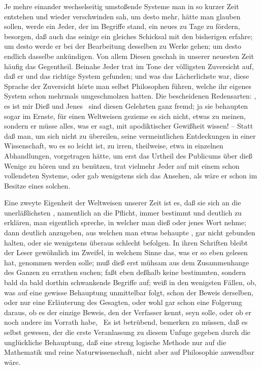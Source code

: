 \begin{aufza}
\begin{aufzb}
\item Je mehre einander wechselseitig umstoßende Systeme man in so kurzer Zeit entstehen und wieder verschwinden sah, um desto mehr, hätte man glauben sollen, werde ein Jeder, der im Begriffe stand, ein neues zu Tage zu fördern, besorgen, daß auch das seinige ein gleiches Schicksal mit den bisherigen erfahre; um desto  werde er bei der Bearbeitung desselben zu Werke gehen; um desto  endlich dasselbe ankündigen. Von allem Diesen geschah in unserer neuesten Zeit häufig das Gegentheil. Beinahe Jeder trat im Tone der völligsten Zuversicht auf, daß er und  das richtige System gefunden; und was das Lächerlichste war, diese Sprache der Zuversicht hörte man selbst Philosophen führen, welche ihr eigenes System schon mehrmals umgeschmolzen hatten. Die bescheidenen Redensarten: , es ist mir  Dieß und Jenes  \usw\, sind diesen Gelehrten ganz fremd; ja sie behaupten sogar im Ernste, für einen Weltweisen gezieme es sich nicht, etwas zu meinen, sondern er müsse alles, was er sagt, mit apodiktischer Gewißheit wissen! -- Statt daß man, um sich nicht zu übereilen, seine vermeintlichen Entdeckungen in einer Wissenschaft, wo es so leicht ist, zu irren, theilweise, etwa in einzelnen Abhandlungen, vorgetragen hätte, um erst das Urtheil des Publicums über dieß Wenige zu hören und zu benützen, trat vielmehr Jeder auf mit einem schon vollendeten Systeme, oder gab wenigstens sich das Ansehen, als wäre er schon im Besitze eines solchen.
\item Eine zweyte Eigenheit der Weltweisen unserer Zeit ist es, daß sie sich an die unerläßlichsten , namentlich an die Pflicht, immer bestimmt und deutlich zu erklären,  man eigentlich spreche, in welcher  man dieß oder jenes Wort nehme; dann deutlich anzugeben, aus welchen  man etwas behaupte \usw , gar nicht gebunden halten, oder sie wenigstens überaus schlecht befolgen. In ihren Schriften bleibt der Leser gewöhnlich im Zweifel, in welchem Sinne das, was er so eben gelesen hat, genommen werden solle; muß dieß erst mühsam aus dem Zusammenhange des Ganzen zu errathen suchen; faßt eben deßhalb keine bestimmten, sondern bald da bald dorthin schwankende Begriffe auf; weiß in den wenigsten Fällen, ob, was auf eine gewisse Behauptung unmittelbar folgt, schon der Beweis derselben, oder nur eine Erläuterung des Gesagten, oder wohl gar schon eine Folgerung daraus, ob es der einzige Beweis, den der Verfasser kennt, seyn solle, oder ob er noch andere im Vorrath habe, \usw\ Es ist betrübend, bemerken zu müssen, daß es  selbst gewesen, der die erste Veranlassung zu diesem Unfuge gegeben durch die unglückliche Behauptung, daß eine streng logische Methode nur auf die Mathematik und reine Naturwissenschaft, nicht aber auf Philosophie anwendbar wäre.

\end{aufzb}
\end{aufza}
